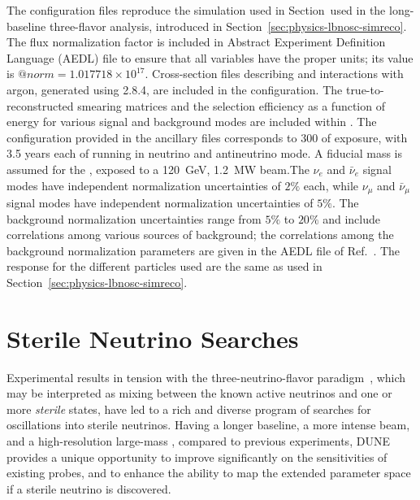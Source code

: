 The   configuration files reproduce the  simulation used in Section~used in the long-baseline three-flavor analysis, introduced in Section~\ref{sec:physics-lbnosc-simreco}.
The flux normalization factor is included in   Abstract Experiment Definition Language (AEDL) 
file to ensure that all variables have the proper units; its value is $@norm = 1.017718\times 10^{17}$. Cross-section files describing  and  interactions with argon, generated using  2.8.4, are included in the configuration. The true-to-reconstructed smearing matrices and the selection efficiency as a function of energy for various signal and background modes are included within . The   configuration provided in the ancillary files corresponds to \SI{300}{\ktMWyr} of exposure, with 3.5 years each of running in neutrino and antineutrino mode.
A \fdfiducialmass fiducial mass is assumed for the , exposed to a \SI{120}{GeV}, \SI{1.2}{MW} beam.The $\nu_{e}$ and $\bar\nu_{e}$ signal  modes have independent normalization uncertainties of $2\%$ each, while $\nu_{\mu}$ and $\bar{\nu}_{\mu}$ signal modes have independent normalization uncertainties of $5\%$. The background normalization uncertainties range from $5\%$ to $20\%$ and include
correlations among various sources of background; the correlations among the background normalization
parameters are given in the AEDL file of Ref.~\cite{Alion:2016uaj}. The  response for the different particles used are the same as used in Section~\ref{sec:physics-lbnosc-simreco}.



\section{Sterile Neutrino Searches}
Experimental results in tension with the three-neutrino-flavor paradigm~\cite{LSNDSterile,MiniBooNESterile,GalliumSummary,ReactorSummary}, which may be interpreted as mixing between the known active neutrinos and one or more \textit{sterile} states, have led to a rich and diverse program of searches for oscillations into sterile neutrinos. Having a longer baseline, a more intense beam, and a high-resolution large-mass , %
compared to previous experiments, DUNE provides a unique opportunity to improve significantly on the sensitivities of existing probes, and to enhance the ability to map the extended parameter space if a sterile neutrino is discovered.
	
